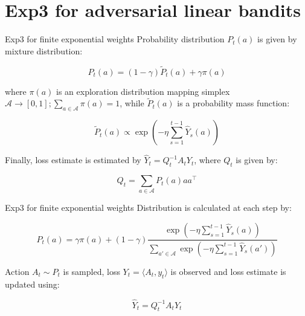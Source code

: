 \documentclass[aspectratio=169,xcolor=dvipsnames]{beamer}
\begin{document}
\section{Exp3 for adversarial linear bandits}
\begin{frame}{Exp3 for finite exponential weights}
    Probability distribution $P_t(a)$ is given by mixture distribution:

    \begin{equation}
        P_t(a) = (1 - \gamma)\tilde{P}_t(a) + \gamma \pi(a)
    \end{equation}

    where $\pi(a)$ is an exploration distribution mapping simplex $\mathbf{\mathcal{A}} \rightarrow [0,1] ; \sum_{a \in \mathbf{\mathcal{A}}} \pi(a) = 1$, while $\tilde{P}_t(a)$ is a probability mass function:

    \begin{equation}
        \tilde{P}_t(a) \propto \exp \left( -\eta \sum_{s=1}^{t-1} \hat{Y}_s(a) \right)
    \end{equation}

    Finally, loss estimate is estimated by $\hat{Y}_t = Q_t^{-1} A_t Y_t$, where $Q_t$ is given by:

    \begin{equation}
        Q_t = \sum_{a \in \mathbf{\mathcal{A}}} P_t(a)aa^{\intercal}
    \end{equation}

\end{frame}

\begin{frame}{Exp3 for finite exponential weights}
    Distribution is calculated at each step by:

    \begin{equation}
        P_t(a) = \gamma \pi(a) + (1 - \gamma) \frac{\exp \left( - \eta \sum_{s=1}^{t-1} \hat{Y}_s(a) \right)}{\sum_{a' \in \mathbf{\mathcal{A}}} \exp \left( - \eta \sum_{s=1}^{t-1} \hat{Y}_s(a') \right)}
    \end{equation}

    Action $A_t \sim P_t$ is sampled, loss $Y_t = \langle A_t, y_t \rangle$ is observed and loss estimate is updated using:

    \begin{equation}
        \hat{Y}_t = Q_t^{-1} A_t Y_t
    \end{equation}

\end{frame}
\end{document}
